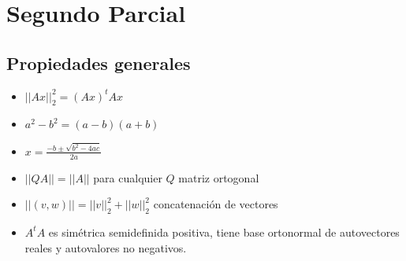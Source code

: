 \section*{Segundo Parcial}
\subsection*{Propiedades generales}
\begin{itemize}
    \item $||Ax||_2^2 = (Ax)^t Ax$
    \item $a^2-b^2 = (a-b) (a+b)$
    \item $x = \frac {-b \pm \sqrt {b^2 - 4ac}}{2a}$
    \item $||QA|| = ||A||$ para cualquier $Q$ matriz ortogonal
    \item $||(v,w)|| = ||v||_2^2+||w||_2^2$ concatenación de vectores
    \item $A^tA$ es simétrica semidefinida positiva, tiene base ortonormal de autovectores reales y autovalores no negativos. 
\end{itemize}
